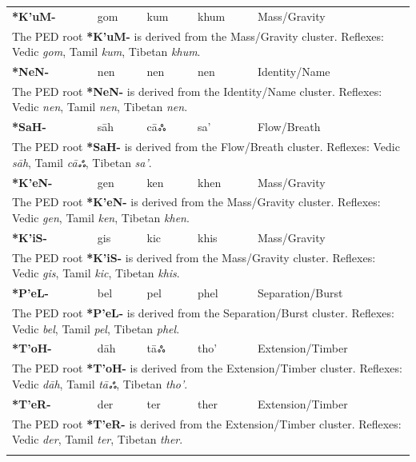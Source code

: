 \begin{longtable}{p{} p{} p{} p{} p{}}
\textbf{*K'uM-} & gom & kum & khum & Mass/Gravity \\ 
\multicolumn{5}{p{\textwidth}}{\small The PED root \textbf{*K'uM-} is derived from the Mass/Gravity cluster. Reflexes: Vedic \textit{gom}, Tamil \textit{kum}, Tibetan \textit{khum}. } \\ \addlinespace 
\textbf{*NeN-} & nen & nen & nen & Identity/Name \\ 
\multicolumn{5}{p{\textwidth}}{\small The PED root \textbf{*NeN-} is derived from the Identity/Name cluster. Reflexes: Vedic \textit{nen}, Tamil \textit{nen}, Tibetan \textit{nen}. } \\ \addlinespace 
\textbf{*SaH-} & sāh & cāஃ & sa' & Flow/Breath \\ 
\multicolumn{5}{p{\textwidth}}{\small The PED root \textbf{*SaH-} is derived from the Flow/Breath cluster. Reflexes: Vedic \textit{sāh}, Tamil \textit{cāஃ}, Tibetan \textit{sa'}. } \\ \addlinespace 
\textbf{*K'eN-} & gen & ken & khen & Mass/Gravity \\ 
\multicolumn{5}{p{\textwidth}}{\small The PED root \textbf{*K'eN-} is derived from the Mass/Gravity cluster. Reflexes: Vedic \textit{gen}, Tamil \textit{ken}, Tibetan \textit{khen}. } \\ \addlinespace 
\textbf{*K'iS-} & gis & kic & khis & Mass/Gravity \\ 
\multicolumn{5}{p{\textwidth}}{\small The PED root \textbf{*K'iS-} is derived from the Mass/Gravity cluster. Reflexes: Vedic \textit{gis}, Tamil \textit{kic}, Tibetan \textit{khis}. } \\ \addlinespace 
\textbf{*P'eL-} & bel & pel & phel & Separation/Burst \\ 
\multicolumn{5}{p{\textwidth}}{\small The PED root \textbf{*P'eL-} is derived from the Separation/Burst cluster. Reflexes: Vedic \textit{bel}, Tamil \textit{pel}, Tibetan \textit{phel}. } \\ \addlinespace 
\textbf{*T'oH-} & dāh & tāஃ & tho' & Extension/Timber \\ 
\multicolumn{5}{p{\textwidth}}{\small The PED root \textbf{*T'oH-} is derived from the Extension/Timber cluster. Reflexes: Vedic \textit{dāh}, Tamil \textit{tāஃ}, Tibetan \textit{tho'}. } \\ \addlinespace 
\textbf{*T'eR-} & der & ter & ther & Extension/Timber \\ 
\multicolumn{5}{p{\textwidth}}{\small The PED root \textbf{*T'eR-} is derived from the Extension/Timber cluster. Reflexes: Vedic \textit{der}, Tamil \textit{ter}, Tibetan \textit{ther}. } \\ \addlinespace 

\end{longtable}
